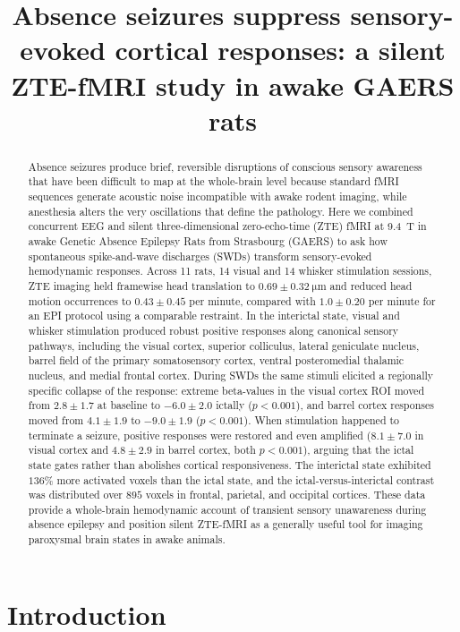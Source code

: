 \documentclass[11pt]{article}
\title{Absence seizures suppress sensory-evoked cortical responses: a silent ZTE-fMRI study in awake GAERS rats}
\author{}
\date{}
\begin{document}
\maketitle

\begin{abstract}
Absence seizures produce brief, reversible disruptions of conscious sensory awareness that have been difficult to map at the whole-brain level because standard fMRI sequences generate acoustic noise incompatible with awake rodent imaging, while anesthesia alters the very oscillations that define the pathology. Here we combined concurrent EEG and silent three-dimensional zero-echo-time (ZTE) fMRI at 9.4~T in awake Genetic Absence Epilepsy Rats from Strasbourg (GAERS) to ask how spontaneous spike-and-wave discharges (SWDs) transform sensory-evoked hemodynamic responses. Across 11 rats, 14 visual and 14 whisker stimulation sessions, ZTE imaging held framewise head translation to $0.69 \pm 0.32~\si{\micro\metre}$ and reduced head motion occurrences to $0.43 \pm 0.45$ per minute, compared with $1.0 \pm 0.20$ per minute for an EPI protocol using a comparable restraint. In the interictal state, visual and whisker stimulation produced robust positive responses along canonical sensory pathways, including the visual cortex, superior colliculus, lateral geniculate nucleus, barrel field of the primary somatosensory cortex, ventral posteromedial thalamic nucleus, and medial frontal cortex. During SWDs the same stimuli elicited a regionally specific collapse of the response: extreme beta-values in the visual cortex ROI moved from $2.8 \pm 1.7$ at baseline to $-6.0 \pm 2.0$ ictally ($p<0.001$), and barrel cortex responses moved from $4.1 \pm 1.9$ to $-9.0 \pm 1.9$ ($p<0.001$). When stimulation happened to terminate a seizure, positive responses were restored and even amplified ($8.1 \pm 7.0$ in visual cortex and $4.8 \pm 2.9$ in barrel cortex, both $p<0.001$), arguing that the ictal state gates rather than abolishes cortical responsiveness. The interictal state exhibited $136\%$ more activated voxels than the ictal state, and the ictal-versus-interictal contrast was distributed over $895$ voxels in frontal, parietal, and occipital cortices. These data provide a whole-brain hemodynamic account of transient sensory unawareness during absence epilepsy and position silent ZTE-fMRI as a generally useful tool for imaging paroxysmal brain states in awake animals.
\end{abstract}

\section{Introduction}
\end{document}

